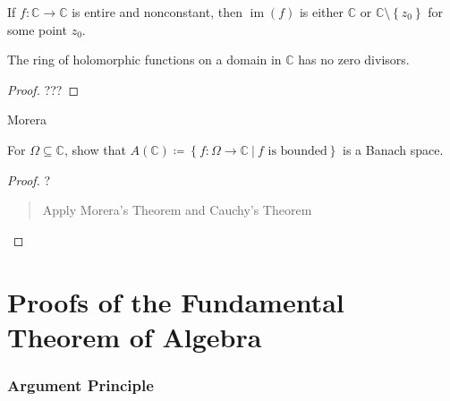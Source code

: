 \begin{theorem}

If \(f:{\mathbb{C}}\to {\mathbb{C}}\) is entire and nonconstant, then
\(\operatorname{im}(f)\) is either \({\mathbb{C}}\) or
\({\mathbb{C}}\setminus\left\{{z_0}\right\}\) for some point \(z_0\).

\end{theorem}


\begin{corollary}

The ring of holomorphic functions on a domain in \({\mathbb{C}}\) has no
zero divisors.

\end{corollary}

\begin{proof}

???

\end{proof}


Morera

\begin{proposition}

For \(\Omega\subseteq{\mathbb{C}}\), show that
\(A({\mathbb{C}})\coloneqq\left\{{f: \Omega \to {\mathbb{C}}{~\mathrel{\Big|}~}f\text{ is bounded}}\right\}\)
is a Banach space.

\end{proposition}

\begin{proof}

?

\begin{quote}
Apply Morera's Theorem and Cauchy's Theorem
\end{quote}

\end{proof}

\hypertarget{proofs-of-the-fundamental-theorem-of-algebra}{%
\section{Proofs of the Fundamental Theorem of
Algebra}\label{proofs-of-the-fundamental-theorem-of-algebra}}

\hypertarget{argument-principle-1}{%
\subsubsection{Argument Principle}\label{argument-principle-1}}

